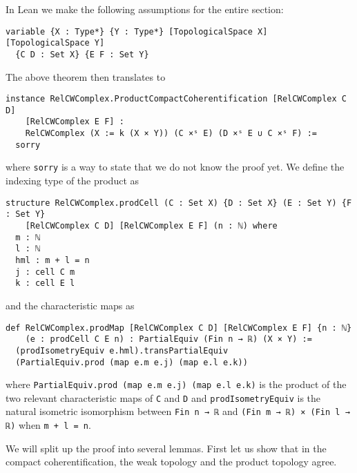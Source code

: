 In Lean we make the following assumptions for the entire section: 

\begin{lstlisting}[frame=single]
variable {X : Type*} {Y : Type*} [TopologicalSpace X] [TopologicalSpace Y] 
  {C D : Set X} {E F : Set Y}
\end{lstlisting}

The above theorem then translates to

\begin{lstlisting}[frame=single]
instance RelCWComplex.ProductCompactCoherentification [RelCWComplex C D] 
    [RelCWComplex E F] : 
    RelCWComplex (X := k (X × Y)) (C ×ˢ E) (D ×ˢ E ∪ C ×ˢ F) := 
  sorry
\end{lstlisting}

where \lstinline|sorry| is a way to state that we do not know the proof yet. 
We define the indexing type of the product as 

\begin{lstlisting}[frame=single]
structure RelCWComplex.prodCell (C : Set X) {D : Set X} (E : Set Y) {F : Set Y} 
    [RelCWComplex C D] [RelCWComplex E F] (n : ℕ) where
  m : ℕ
  l : ℕ
  hml : m + l = n
  j : cell C m
  k : cell E l
\end{lstlisting}

and the characteristic maps as

\begin{lstlisting}[frame=single]
def RelCWComplex.prodMap [RelCWComplex C D] [RelCWComplex E F] {n : ℕ} 
    (e : prodCell C E n) : PartialEquiv (Fin n → ℝ) (X × Y) :=
  (prodIsometryEquiv e.hml).transPartialEquiv
  (PartialEquiv.prod (map e.m e.j) (map e.l e.k))
\end{lstlisting}

where \lstinline|PartialEquiv.prod (map e.m e.j) (map e.l e.k)| is the product of the two relevant characteristic maps of \lstinline|C| and \lstinline|D| and \lstinline|prodIsometryEquiv| is the natural isometric isomorphism between \lstinline|Fin n → ℝ| and \lstinline|(Fin m → ℝ) × (Fin l → ℝ)| when \lstinline|m + l = n|.

We will split up the proof into several lemmas. 
First let us show that in the compact coherentification, the weak topology and the product topology agree. 

